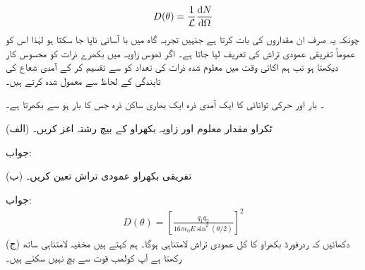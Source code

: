 \begin{align}
	D(\theta) = \frac{1}{\mathcal{L}}\frac{\dif N}{\dif\Omega}
\end{align}
چونکہ یہ صرف ان مقداروں کی بات کرتا ہے جنہیں تجربہ گاہ میں با آسانی ناپا جا سکتا ہو لہٰذا اس کو عموماً تفریقی عمودی تراش کی تعریف لیا جاتا ہے۔ اگر ٹھوس زاویہ  میں بکھرے ذرات کو محسوس کار دیکھتا ہو تب ہم اکائی وقت میں معلوم شدہ ذرات کی تعداد کو  سے تقسیم کر کے آمدی شعاع کی تابندگی کے لحاظ سے معمول شدہ کرتے ہیں۔

۔ بار  اور حرکی توانائی  کا ایک آمدی ذرہ ایک بھاری ساکن ذرہ جس کا بار  ہو 	سے بکھرتا ہے۔

(الف) ٹکراو مقدار معلوم اور زاویہ بکھراو کے بیچ رشتہ اغز کریں۔

جواب: 

(ب) تفریقی بکھراو عمودی تراش تعین کریں۔

جواب:
\begin{align}
	D(\theta)=\left[\frac{q_1q_2}{16\pi\epsilon_0E\sin^2(\theta/2)}\right]^2
\end{align}
(ج) دکھائیں کہ ردرفورڈ بکھراو کا کل عمودی تراش لامتناہی ہوگا۔ ہم کہتے ہیں  مخفیہ لامتناہی ساتھ رکھتا ہے آپ کولمب قوت سے بچ نہیں سکتے ہیں۔

